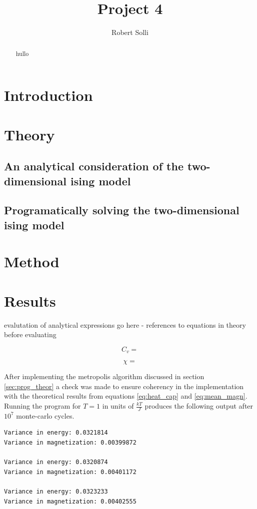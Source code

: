 \documentclass[12pt]{article}
\begin{document}
\title{Project 4}
\author{Robert Solli}
\maketitle
\begin{abstract}
hullo
\end{abstract}

\section*{Introduction}
\section*{Theory}
\subsection*{An analytical consideration of the two-dimensional ising model}
\subsection*{Programatically solving the two-dimensional ising model}\label{sec:prog_theor}
\section*{Method}
\section*{Results}

evalutation of analytical expressions go here - references to equations in theory before evaluating

\begin{equation}\label{eq:heat_cap}
C_v = 
\end{equation}

\begin{equation}\label{eq:mean_magn}
\chi =
\end{equation}

After implementing the metropolis algorithm discussed in section \ref{sec:prog_theor} a check was made to ensure coherency in the implementation with the theoretical results from equations \ref{eq:heat_cap} and \ref{eq:mean_magn}. Running the program for $T = 1$ in units of $\frac{kT}{J}$ produces the following output after $10^7$ monte-carlo cycles.

\begin{lstlisting}
Variance in energy: 0.0321814
Variance in magnetization: 0.00399872

Variance in energy: 0.0320874
Variance in magnetization: 0.00401172

Variance in energy: 0.0323233
Variance in magnetization: 0.00402555
\end{lstlisting} 
\end{document}
